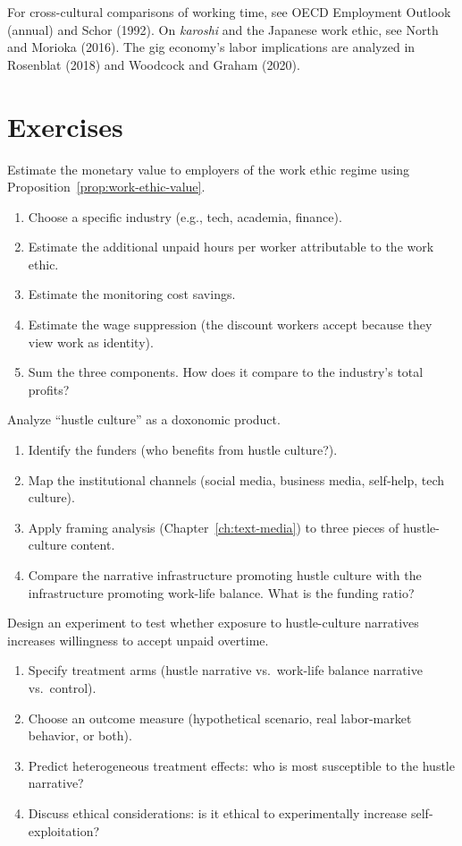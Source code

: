 For cross-cultural comparisons of working time, see OECD Employment Outlook (annual) and Schor (1992).
On \emph{karoshi} and the Japanese work ethic, see North and Morioka (2016).
The gig economy's labor implications are analyzed in Rosenblat (2018) and Woodcock and Graham (2020).

\section{Exercises}

\begin{exercise}
Estimate the monetary value to employers of the work ethic regime using Proposition~\ref{prop:work-ethic-value}.
\begin{enumerate}[nosep]
  \item Choose a specific industry (e.g., tech, academia, finance).
  \item Estimate the additional unpaid hours per worker attributable to the work ethic.
  \item Estimate the monitoring cost savings.
  \item Estimate the wage suppression (the discount workers accept because they view work as identity).
  \item Sum the three components. How does it compare to the industry's total profits?
\end{enumerate}
\end{exercise}

\begin{exercise}
Analyze ``hustle culture'' as a doxonomic product.
\begin{enumerate}[nosep]
  \item Identify the funders (who benefits from hustle culture?).
  \item Map the institutional channels (social media, business media, self-help, tech culture).
  \item Apply framing analysis (Chapter~\ref{ch:text-media}) to three pieces of hustle-culture content.
  \item Compare the narrative infrastructure promoting hustle culture with the infrastructure promoting work-life balance. What is the funding ratio?
\end{enumerate}
\end{exercise}

\begin{exercise}
Design an experiment to test whether exposure to hustle-culture narratives increases willingness to accept unpaid overtime.
\begin{enumerate}[nosep]
  \item Specify treatment arms (hustle narrative vs.\ work-life balance narrative vs.\ control).
  \item Choose an outcome measure (hypothetical scenario, real labor-market behavior, or both).
  \item Predict heterogeneous treatment effects: who is most susceptible to the hustle narrative?
  \item Discuss ethical considerations: is it ethical to experimentally increase self-exploitation?
\end{enumerate}
\end{exercise}

